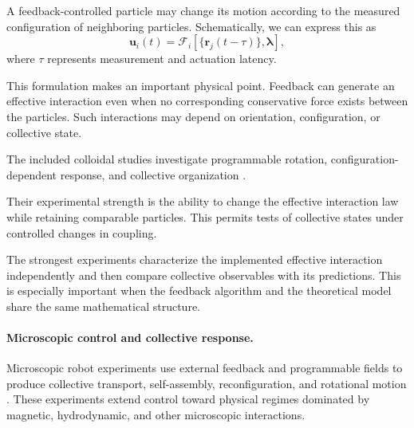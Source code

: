 A feedback-controlled particle may change its
motion according to the measured configuration
of neighboring particles. Schematically,
we can express this as
\begin{equation}
\mathbf u_i(t)=
\mathcal F_i\!\left[
\{\mathbf r_j(t-\tau)\},
\boldsymbol{\lambda}
\right],
\label{eq:control-feedback}
\end{equation}
where $\tau$ represents measurement and
actuation latency.

This formulation makes an important physical
point. Feedback can generate an effective
interaction even when no corresponding
conservative force exists between the
particles. Such interactions may depend
on orientation, configuration, or
collective state.

The included colloidal studies investigate
programmable rotation, configuration-dependent
response, and collective organization
\cite{Martinet2022rotationcontrolin,Yan2014colloidalsuperstruc,Chen2024synchronousandfull,Buerle2020formationofstable,Aubret2021metamachinesofplur,Heuthe2025tunablecolloidalsw,Knippenberg2022roleofcohesionin,Han2020programmablechiral,Chen2022collectiveresponse,Guo2026afeedbackcontrolle,Chen2024persistentandrespo,Lffler2021behaviordependentc}.

Their experimental strength is the ability
to change the effective interaction law
while retaining comparable particles.
This permits tests of collective states
under controlled changes in coupling.

The strongest experiments characterize
the implemented effective interaction
independently and then compare
collective observables with its
predictions. This is especially
important when the feedback
algorithm and the theoretical
model share the same mathematical
structure.

\paragraph*{Microscopic control and collective response.}

Microscopic robot experiments use external
feedback and programmable fields to
produce collective transport,
self-assembly, reconfiguration,
and rotational motion
\cite{Sun2021swarmingmicrodrople,Xie2020bioinspiredsoftmic,MayorgaMartinez2023multimodaldrivenma,Yigit2019programmablecollect,Das2023optoelectronictraje,Feng2023weakionexchangeba,Cao2024mofbasedmagneticm,Li2023swarmingresponsive,Gong2025collectivereconfigu,Chen2020temporallightmodul,Chen2022programmablespatio,Xu2022collectivebehaviors,Liu2023swarmingmultifuncti,Chen2023nanorobotmediateds,Ussia2024magneticmicrorobot,Tran2025roboticmicrocapsule,Xia2025artificialintellige,Wang2026reconfigurableassem,Kim2026magneticmxenebased,Aubret2018targetedassemblyan,Ahmed2021bioinspiredacousto,Raghavendra2026programmablepersist}.
These experiments extend control toward
physical regimes dominated by magnetic,
hydrodynamic, and other microscopic
interactions.

